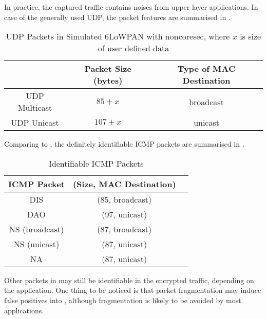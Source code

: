 In practice, the captured traffic contains noises from upper layer applications. In case of the generally used UDP\cite{rfc768}, the packet features are summarised in .

\begin{table}[ht!]
	\center
	{
		\begin{tabular}{|c|c|c|}
			\hline
			       & Packet Size (bytes) & Type of MAC Destination \\ \hline
			UDP Multicast   & $85+x$                  & broadcast                       \\ \hline
			UDP Unicast   & $107+x$                  & unicast                       \\ \hline
		\end{tabular}
	}
	\caption{UDP Packets in Simulated 6LoWPAN with noncoresec, where $x$ is size of user defined data}
	\label{UDPPacketFeature}
\end{table}

Comparing  to , the definitely identifiable ICMP packets are summarised in .

\begin{table}[ht!]
	\center
	{
		\begin{tabular}{|c|c|c|}
			\hline
			ICMP Packet & (Size, MAC Destination)\\ \hline
			DIS   & (85, broadcast)                       \\ \hline
			DAO   & (97, unicast)                       \\ \hline
			NS (broadcast)   & (87, broadcast)                       \\ \hline	
			NS (unicast)   & (87, unicast)                       \\ \hline
			NA 	& (87, unicast)                       \\ \hline
		\end{tabular}
	}
	\caption{Identifiable ICMP Packets}
	\label{TAICMP}
\end{table}

Other packets in  may still be identifiable in the encrypted traffic, depending on the application. One thing to be noticed is that packet fragmentation may induce false positives into , although fragmentation is likely to be avoided by most applications.

